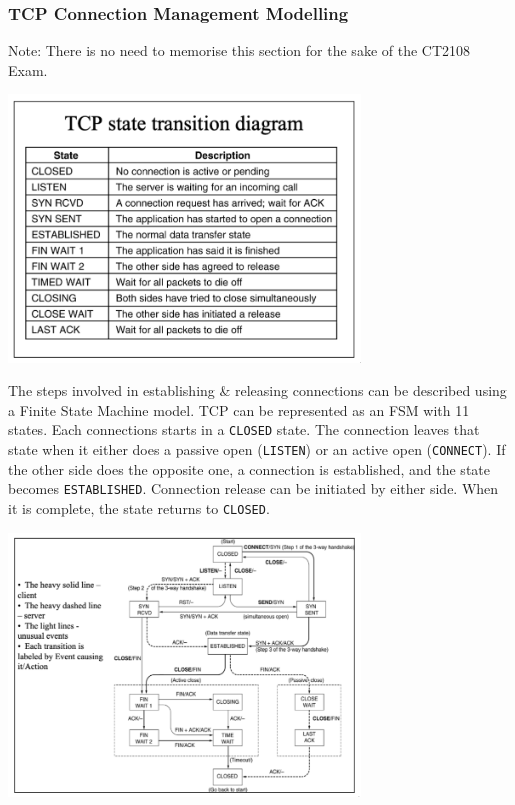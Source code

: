 \documentclass[11pt]{article}
\begin{document}
\subsubsection{TCP Connection Management Modelling}
Note: There is no need to memorise this section for the sake of the CT2108 Exam. 

\begin{center}
    \includegraphics[width=0.7\textwidth]{tcpstatetransitiondiagram.png}
\end{center}

The steps involved in establishing \& releasing connections can be described using a Finite State Machine 
model. 
TCP can be represented as an FSM with 11 states.
Each connections starts in a \verb|CLOSED| state.
The connection leaves that state when it either does a passive open (\verb|LISTEN|) or an active open 
(\verb|CONNECT|).
If the other side does the opposite one, a connection is established, and the state becomes \verb|ESTABLISHED|.
Connection release can be initiated by either side. 
When it is complete, the state returns to \verb|CLOSED|.

\begin{center}
    \includegraphics[width=0.7\textwidth]{tcpconnectionmanagementfsm.png}
\end{center}
\end{document}
